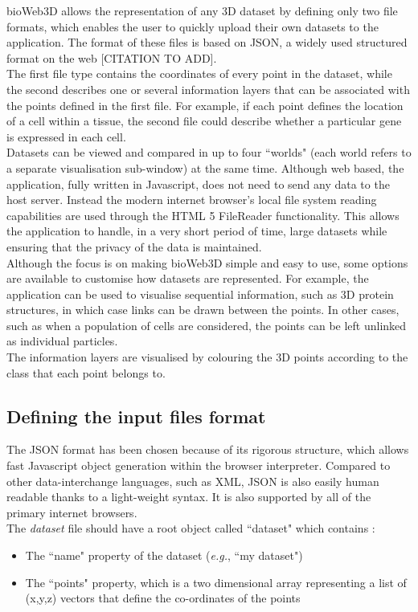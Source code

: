 \documentclass{bioinfo}
\begin{document}
bioWeb3D allows the representation of any 3D dataset by defining only two file formats, which enables the user to quickly upload their own datasets to the application. The format of these files is based on JSON, a widely used structured format on the web [CITATION TO ADD].\\
The first file type contains the coordinates of every point in the dataset, while the second describes one or several information layers that can be associated with the points defined in the first file. For example, if each point defines the location of a cell within a tissue, the second file could describe whether a particular gene is expressed in each cell. \\
Datasets can be viewed and compared in up to four ``worlds" (each world refers to a separate visualisation sub-window) at the same time. Although web based, the application, fully written in Javascript, does not need to send any data to the host server. Instead the modern internet browser's local file system reading capabilities are used through the HTML 5 FileReader functionality. This allows the application to handle, in a very short period of time, large datasets while ensuring that the privacy of the data is maintained.\\
Although the focus is on making bioWeb3D simple and easy to use, some options are available to customise how datasets are represented. For example, the application can be used to visualise sequential information, such as 3D protein structures, in which case links can be drawn between the points. In other cases, such as when a population of cells are considered, the points can be left unlinked as individual particles. \\
The information layers are visualised by colouring the 3D points according to the class that each point belongs to.
\subsection{Defining the input files format}
The JSON format has been chosen because of its rigorous structure, which allows fast Javascript object generation within the browser interpreter. Compared to other data-interchange languages, such as XML, JSON is also easily human readable thanks to a light-weight syntax. It is also supported by all of the primary internet browsers.\\
The {\it{dataset}} file should have a root object called ``dataset" which contains :
\begin{itemize}
\item The ``name" property of the dataset (\textit{e.g.}, ``my dataset") 
\item The ``points" property, which is a two dimensional array representing a list of (x,y,z) vectors that define the co-ordinates of the points
\end{itemize}
\end{document}
